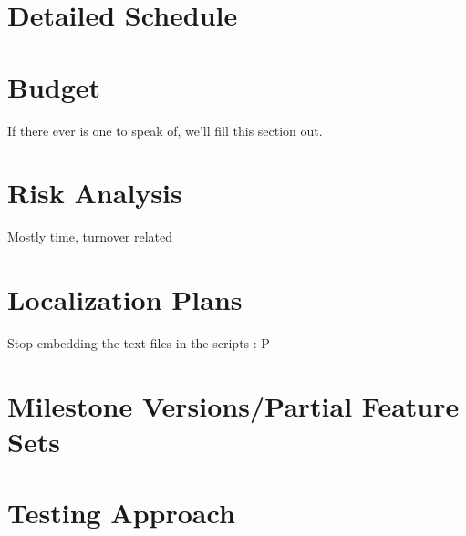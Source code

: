 \section{Detailed Schedule}
\section{Budget}
If there ever is one to speak of, we'll fill this section out.
\section{Risk Analysis}
Mostly time, turnover related
\section{Localization Plans}
Stop embedding the text files in the scripts :-P
\section{Milestone Versions/Partial Feature Sets}
\section{Testing Approach}
